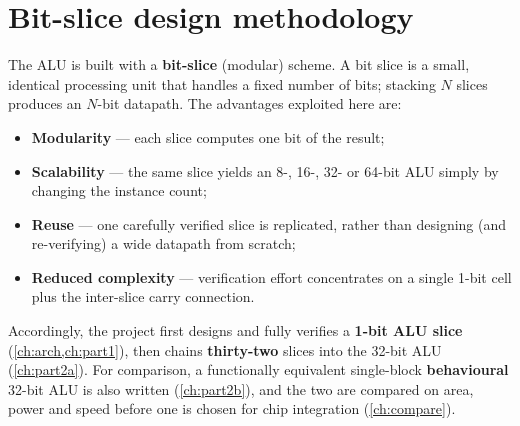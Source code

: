 \section{Bit-slice design methodology}
The ALU is built with a \textbf{bit-slice} (modular) scheme. A bit slice
is a small, identical processing unit that handles a fixed number of bits;
stacking $N$ slices produces an $N$-bit datapath. The advantages exploited
here are:
\begin{itemize}
  \item \textbf{Modularity} --- each slice computes one bit of the result;
  \item \textbf{Scalability} --- the same slice yields an 8-, 16-, 32- or
        64-bit ALU simply by changing the instance count;
  \item \textbf{Reuse} --- one carefully verified slice is replicated,
        rather than designing (and re-verifying) a wide datapath from
        scratch;
  \item \textbf{Reduced complexity} --- verification effort concentrates
        on a single 1-bit cell plus the inter-slice carry connection.
\end{itemize}
Accordingly, the project first designs and fully verifies a \textbf{1-bit
ALU slice} (\cref{ch:arch,ch:part1}), then chains \textbf{thirty-two}
slices into the 32-bit ALU (\cref{ch:part2a}). For comparison, a
functionally equivalent single-block \textbf{behavioural} 32-bit ALU is
also written (\cref{ch:part2b}), and the two are compared on area, power
and speed before one is chosen for chip integration (\cref{ch:compare}).
